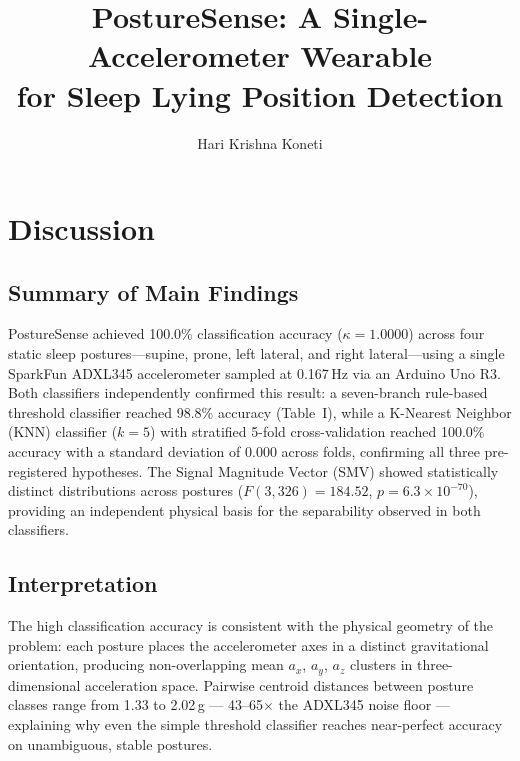 \documentclass[conference]{IEEEtran}
\begin{document}
\title{PostureSense: A Single-Accelerometer Wearable\\for Sleep Lying Position Detection}

\author{Hari Krishna Koneti}

\maketitle

\section{Discussion}

\subsection{Summary of Main Findings}

PostureSense achieved 100.0\% classification accuracy ($\kappa = 1.0000$) across
four static sleep postures---supine, prone, left lateral, and right lateral---using a
single SparkFun ADXL345 accelerometer sampled at 0.167\,Hz via an Arduino Uno R3.
Both classifiers independently confirmed this result: a seven-branch rule-based
threshold classifier reached 98.8\% accuracy (Table~I), while a K-Nearest Neighbor
(KNN) classifier ($k=5$) with stratified 5-fold cross-validation reached 100.0\%
accuracy with a standard deviation of 0.000 across folds, confirming all three
pre-registered hypotheses.
The Signal Magnitude Vector (SMV) showed statistically distinct distributions across
postures ($F(3,326)=184.52$, $p=6.3\times10^{-70}$), providing an independent
physical basis for the separability observed in both classifiers.

\subsection{Interpretation}

The high classification accuracy is consistent with the physical geometry of the
problem: each posture places the accelerometer axes in a distinct gravitational
orientation, producing non-overlapping mean $a_x$, $a_y$, $a_z$ clusters in
three-dimensional acceleration space.
Pairwise centroid distances between posture classes range from 1.33 to 2.02\,g ---
43--65$\times$ the ADXL345 noise floor --- explaining why even the simple threshold
classifier reaches near-perfect accuracy on unambiguous, stable postures.
\end{document}
